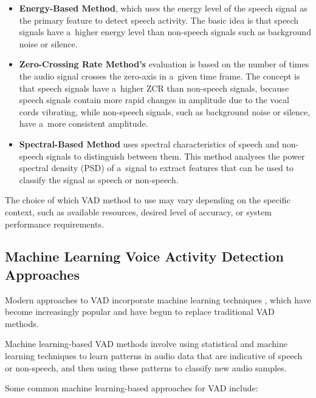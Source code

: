 \begin{itemize}
    \item \textbf{Energy-Based Method}, which uses the energy level of the speech signal as the primary feature to detect speech activity. The basic idea is that speech signals have a~higher energy level than non-speech signals such as background noise or silence.
    \item \textbf{Zero-Crossing Rate Method's} evaluation is based on the number of times the audio signal crosses the zero-axis in a~given time frame. The concept is that speech signals have a~higher ZCR than non-speech signals, because speech signals contain more rapid changes in amplitude due to the vocal cords vibrating, while non-speech signals, such as background noise or silence, have a~more consistent amplitude.
    \item \textbf{Spectral-Based Method} uses spectral characteristics of speech and non-speech signals to distinguish between them. This method analyses the power spectral density (PSD) of a~signal to extract features that can be used to classify the signal as speech or non-speech.
\end{itemize}

The choice of which VAD method to use may vary depending on the specific context, such as available resources, desired level of accuracy, or system performance requirements.

\subsection{Machine Learning Voice Activity Detection Approaches}\label{modern}
Modern approaches to VAD incorporate machine learning techniques \cite{6857341, aaltonn}, which have become increasingly popular and have begun to replace traditional VAD methods.

Machine learning-based VAD methods involve using statistical and machine learning techniques to learn patterns in audio data that are indicative of speech or non-speech, and then using these patterns to classify new audio samples.

Some common machine learning-based approaches for VAD include:

